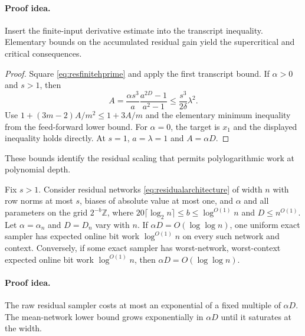 \paragraph{Proof idea.}
Insert the finite-input derivative estimate into the transcript inequality.
Elementary bounds on the accumulated residual gain yield the supercritical
and critical consequences.

\begin{proof}
Square \eqref{eq:resfinitehprime} and apply the first transcript
bound. If $\alpha>0$ and $s>1$, then
\[
A=\frac{\alpha s^3}{a}\frac{a^{2D}-1}{a^2-1}
\le\frac{s^3}{2\delta}\lambda^2.
\]
Use $1+(3m-2)A/m^2\le1+3A/m$ and the elementary minimum
inequality from the feed-forward lower bound.
For $\alpha=0$, the target is $x_1$ and the displayed inequality
holds directly. At $s=1$, $a=\lambda=1$ and $A=\alpha D$.
\end{proof}

These bounds identify the residual scaling that permits
polylogarithmic work at polynomial depth.

\begin{corollary}
\label{cor:residual-loglog-depth}
Fix $s>1$. Consider residual networks \eqref{eq:residualarchitecture}
of width $n$ with row norms at most $s$, biases of absolute value at
most one, and $\alpha$ and all parameters on the grid
$2^{-b}\mathbb Z$, where $20\lceil\log_2n\rceil\le b\le\log^{O(1)}n$
and $D\le n^{O(1)}$. Let $\alpha=\alpha_n$ and $D=D_n$ vary with $n$.
If $\alpha D=O(\log\log n)$, one uniform exact sampler has expected
online bit work $\log^{O(1)}n$ on every such network and context.
Conversely, if some exact sampler has worst-network, worst-context
expected online bit work $\log^{O(1)}n$, then
$\alpha D=O(\log\log n)$.
\end{corollary}
\paragraph{Proof idea.}
The raw residual sampler costs at most an exponential of a fixed
multiple of $\alpha D$. The mean-network lower bound grows
exponentially in $\alpha D$ until it saturates at the width.

